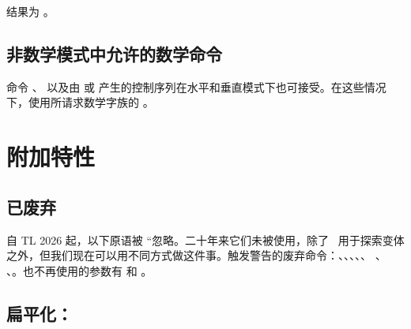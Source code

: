 结果为 \inlinebuffer[script]。

\subsection{非数学模式中允许的数学命令}


命令 、 以及由  或  产生的控制序列在水平和垂直模式下也可接受。在这些情况下，使用所请求数学字族的 。

%
%
% 
% 
% 
% 
% 
%
% 

\section{附加特性}

\subsection {已废弃}

自 TL 2026 起，以下原语被 ``忽略。二十年来它们未被使用，除了 \CONTEXT\ 用于探索变体之外，但我们现在可以用不同方式做这件事。触发警告的废弃命令：\typ {\mathoption}、\typ {\mathitalicssmode}、\typ {\mathnolimitsmode}、\typ {\mathscriptboxmode}、\typ {\mathscriptcharmode}、%
\typ {\mathdefaultsmode}、
\typ {\mathrulethicknessmode}、\typ {\mathdelimitersmode}。也不再使用的参数有 \typ {\Umathnolimitsupfactor} 和 \typ
{\Umathnolimitsubfactor}。

\subsection {扁平化：}

